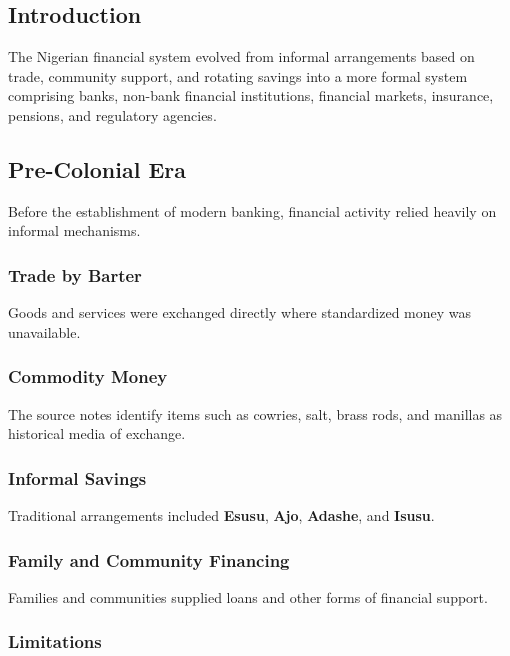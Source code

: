 \documentclass[
]{article}
\begin{document}
\subsection{Introduction}\label{introduction-1}

The Nigerian financial system evolved from informal arrangements based on trade, community support, and rotating savings into a more formal system comprising banks, non-bank financial institutions, financial markets, insurance, pensions, and regulatory agencies.

\subsection{Pre-Colonial Era}\label{pre-colonial-era}

Before the establishment of modern banking, financial activity relied heavily on informal mechanisms.

\subsubsection{Trade by Barter}\label{trade-by-barter}

Goods and services were exchanged directly where standardized money was unavailable.

\subsubsection{Commodity Money}\label{commodity-money}

The source notes identify items such as cowries, salt, brass rods, and manillas as historical media of exchange.

\subsubsection{Informal Savings}\label{informal-savings}

Traditional arrangements included \textbf{Esusu}, \textbf{Ajo}, \textbf{Adashe}, and \textbf{Isusu}.

\subsubsection{Family and Community Financing}\label{family-and-community-financing}

Families and communities supplied loans and other forms of financial support.

\subsubsection{Limitations}\label{limitations}
\end{document}
